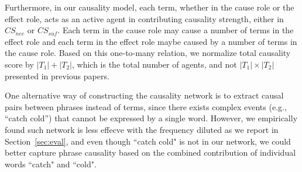 Furthermore, in our causality model, each term, whether in the cause role
or the effect role, acts as an active agent in contributing causality strength,
either in $CS_{nec}$ or $CS_{suf}$. Each term in the cause role may
cause a number of terms in the effect role and each term in the effect role
maybe caused by a number of terms in the cause role. 
Based on this one-to-many relation, we normalize total causality score by
$|T_1|+|T_2|$, which is the total number of agents,
and not $|T_1|\times|T_2|$ presented in previous papers.

One alternative way of constructing the causality network is to extract
causal pairs between phrases instead of terms, since there exists complex 
events (e.g., ``catch cold'') that cannot be expressed by a single word. 
However, we empirically found such network is less effecve with the frequency diluted as we report in Section~\ref{sec:eval}, and even though ``catch cold" is not in our network, we could better capture 
phrase causality based on the combined contribution of individual words ``catch" and ``cold". 


%

